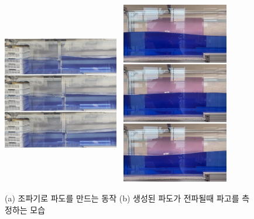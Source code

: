 \begin{figure}[hbp]
    \centering
            \includegraphics[trim=0 0 0 0, clip, width=0.45\textwidth, 
                height=8cm,
                ]
                {images/vlcsnap-2023-06-29-10h35m08s932-1.png} 
            \includegraphics[trim=0 0 0 0, clip, width=0.45\textwidth, 
                height=8cm,
                ]
                {images/vlcsnap-2023-06-29-10h53m08s226-1.png} 
        \caption{(a) 조파기로 파도를 만드는 동작 (b) 생성된 파도가 전파될때 파고를 측정하는 모습}
        \label{result-wave}   
\end{figure}    

